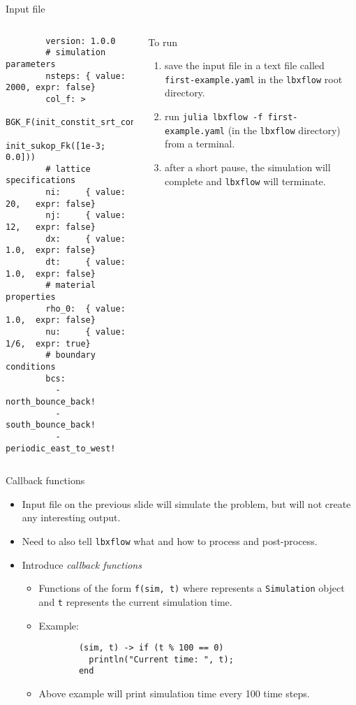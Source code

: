 \documentclass[pdf]{beamer}
\begin{document}
\begin{frame}[fragile]{Input file} \label{frm:input-file-start}
      \tiny
  \begin{columns}
      \begin{verbatim}
        version: 1.0.0
        # simulation parameters
        nsteps: { value: 2000, expr: false}
        col_f: >
               BGK_F(init_constit_srt_const(1/6),
                     init_sukop_Fk([1e-3; 0.0]))
        # lattice specifications
        ni:     { value: 20,   expr: false}
        nj:     { value: 12,   expr: false}
        dx:     { value: 1.0,  expr: false}
        dt:     { value: 1.0,  expr: false}
        # material properties
        rho_0:  { value: 1.0,  expr: false}
        nu:     { value: 1/6,  expr: true}
        # boundary conditions
        bcs:
          - north_bounce_back!
          - south_bounce_back!
          - periodic_east_to_west!
      \end{verbatim}
    \begin{block}{To run}
    \begin{enumerate}
     \item save the input file in a text file called \texttt{first-example.yaml} in the \texttt{lbxflow} root directory.
     \item run \texttt{julia lbxflow -f first-example.yaml} (in the \texttt{lbxflow} directory) from a terminal.
     \item after a short pause, the simulation will complete and \texttt{lbxflow} will terminate.
    \end{enumerate}
    \end{block}
  \end{columns}
\end{frame}

\begin{frame}[fragile]{Callback functions}
  \begin{itemize}
    \item Input file on the previous slide will simulate the problem, but will not create any interesting output.
      \pause
    \item Need to also tell \texttt{lbxflow} what and how to process and post-process.
      \pause
    \item Introduce \textit{callback functions}
      \begin{itemize}
        \item Functions of the form \texttt{f(sim, t)} where  represents a \texttt{Simulation} object and \texttt{t} represents the current simulation time.
        \item Example:
        \begin{lstlisting}
        (sim, t) -> if (t % 100 == 0)
          println("Current time: ", t);
        end
        \end{lstlisting}
      \item Above example will print simulation time every 100 time steps.
      \end{itemize}
  \end{itemize}
  
\end{frame}
\end{document}
